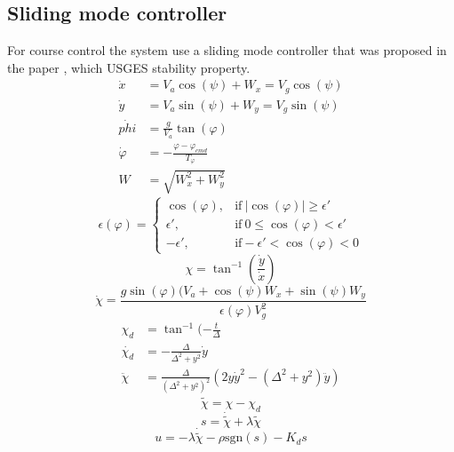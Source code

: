 \subsection{Sliding mode controller}
For course control the system use a sliding mode controller that was proposed in the paper \citep{fortuna2015cascaded}, which USGES stability property.
\begin{subequations}
\begin{align}
\dot{x} &= V_a\cos(\psi) + W_x = V_g\cos(\psi) \\
\dot{y} &= V_a\sin(\psi) + W_y = V_g\sin(\psi) \\
\dot{phi} &= \frac{g}{V_a}\tan(\varphi) \\
\dot{\varphi} &= -\frac{\varphi-\varphi_{cmd}}{T_\varphi} \\
W &= \sqrt{W_x^2 + W_y^2}
\end{align}
\end{subequations}
\begin{equation}
\epsilon(\varphi) = \begin{cases}
\cos(\varphi), & \text{if}\ |\cos(\varphi)|\geq\epsilon'\\
\epsilon', & \text{if}\ 0 \leq \cos(\varphi) < \epsilon' \\
-\epsilon', & \text{if} -\epsilon'<\cos(\varphi) < 0
\end{cases}
\end{equation}
\begin{equation}
\chi = \tan^{-1}(\frac{\dot{y}}{\dot{x}})
\end{equation}
\begin{equation}
\dot{\chi} = \frac{g\sin(\varphi)(V_a + \cos(\psi)W_x + \sin(\psi)W_y}{\epsilon(\varphi)V_g^2}
\end{equation}
\begin{subequations}
\begin{align}
\chi_d &= \tan^{-1}(-\frac{t}{\Delta} \\
\dot{\chi_d} &= -\frac{\Delta}{\Delta^2+y^2}\dot{y} \\
\ddot{\chi} &= \frac{\Delta}{(\Delta^2 + y^2)^2}(2y\dot{y}^2 - (\Delta^2 + y^2)\ddot{y})
\end{align}
\end{subequations}
\begin{equation}
\tilde{\chi} = \chi - \chi_d
\end{equation}
\begin{equation}
s = \dot{\tilde{\chi}} + \lambda\tilde{\chi}
\end{equation}
\begin{equation}
u = -\lambda\dot{\tilde{\chi}} - \rho\text{sgn}(s) - K_ds
\end{equation}